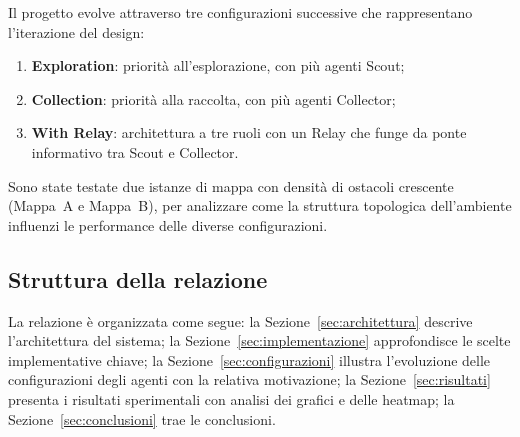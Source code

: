 Il progetto evolve attraverso tre configurazioni successive che rappresentano l'iterazione del design:
\begin{enumerate}
  \item \textbf{Exploration}: priorità all'esplorazione, con più agenti Scout;
  \item \textbf{Collection}: priorità alla raccolta, con più agenti Collector;
  \item \textbf{With Relay}: architettura a tre ruoli con un Relay che funge da ponte informativo tra Scout e Collector.
\end{enumerate}

Sono state testate due istanze di mappa con densità di ostacoli crescente (Mappa~A e Mappa~B), per analizzare come la struttura topologica dell'ambiente influenzi le performance delle diverse configurazioni.

\subsection{Struttura della relazione}

La relazione è organizzata come segue: la Sezione~\ref{sec:architettura} descrive l'architettura del sistema; la Sezione~\ref{sec:implementazione} approfondisce le scelte implementative chiave; la Sezione~\ref{sec:configurazioni} illustra l'evoluzione delle configurazioni degli agenti con la relativa motivazione; la Sezione~\ref{sec:risultati} presenta i risultati sperimentali con analisi dei grafici e delle heatmap; la Sezione~\ref{sec:conclusioni} trae le conclusioni.
